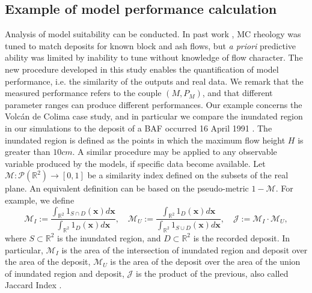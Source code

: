 \documentclass{article}
\begin{document}
\subsection{Example of model performance calculation}
Analysis of model suitability can be conducted. In past work \cite{Patra2005}, MC rheology was tuned to match deposits for known block and ash flows, but {\it a priori} predictive ability was limited by inability to tune without knowledge of flow character. The new procedure developed in this study enables the quantification of model performance, i.e. the similarity of the outputs and real data. We remark that the measured performance refers to the couple $\left(M, P_M\right)$, and that different parameter ranges can produce different performances. Our example concerns the Volc{\'a}n de Colima case study, and in particular we compare the inundated region in our simulations to the deposit of a BAF occurred 16 April 1991 \citep{Saucedo2004, Rupp2004, Rupp2006}. The inundated region is defined as the points in which the maximum flow height $H$ is greater than $10 cm$. A similar procedure may be applied to any observable variable produced by the models, if specific data become available. Let $\mathcal M:\mathcal P(\mathbb R^2)\rightarrow[0,1]$ be a similarity index defined on the subsets of the real plane. An equivalent definition can be based on the pseudo-metric $1-\mathcal M$. For example, we define
$$\mathcal M_I:=\frac{\int_{\mathbb R^2} 1_{S \cap D}(\textbf{x}) d\textbf{x}}{\int_{\mathbb R^2} 1_D(\textbf{x})d\textbf{x}},\quad \mathcal M_U:=\frac{\int_{\mathbb R^2} 1_D(\textbf{x})d\textbf{x}}{\int_{\mathbb R^2} 1_{S \cup D}(\textbf{x}) d\textbf{x}}, \quad \mathcal J:=\mathcal M_I\cdot \mathcal M_U,$$
where $S\subset \mathbb R^2$ is the inundated region, and $D\subset \mathbb R^2$ is the recorded deposit. In particular, $\mathcal M_I$ is the area of the intersection of inundated region and deposit over the area of the deposit, $\mathcal M_U$ is the area of the deposit over the area of the union of inundated region and deposit, $\mathcal J$ is the product of the previous, also called Jaccard Index \citep{Jaccard1901}.
\end{document}
